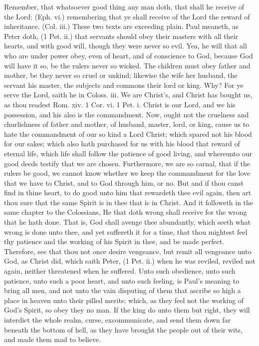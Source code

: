 Remember, that whatsoever good thing any man doth, 
that shall he receive of the Lord: (Eph. vi.) remembering 
that ye shall receive of the Lord the reward of inheritance. 
(Col. iii.) These two texts are exceeding plain. Paul 
meaneth, as Peter doth, (1 Pet. ii.) that servants should 
obey their masters with all their hearts, and with good 
will, though they were never so evil. Yea, he will 
that all who are under power obey, even of heart, and of 
conscience to God, because God will have it so, be the 
rulers never so wicked. The children must obey father 
and mother, be they never so cruel or unkind; likewise 
the wife her husband, the servant his master, the subjects 
and commons their lord or king. Why? For ye serve the 
Lord, saith he in Coloss. iii. We are Christ's, and Christ 
has bought us, as thou readest Rom. xiv. 1 Cor. vi. 
1 Pet. i. Christ is our Lord, and we his possession, and 
his also is the commandment. Now, ought not the cruelness
and churlishness of father and mother, of husband, 
master, lord, or king, cause us to hate the commandment 
of our so kind a Lord Christ; which spared not his blood 
for our sakes; which also hath purchased for us with his 
blood that reward of eternal life, which life shall follow 
the patience of good living, and whereunto our good deeds 
testify that we are chosen. Furthermore, we are so carnal,
that if the rulers be good, we cannot know whether 
we keep the commandment for the love that we have to 
Christ, and to God through him, or no. But and if thou 
canst find in thine heart, to do good unto him that rewardeth 
thee evil again, then art thou sure that the same Spirit is 
in thee that is in Christ. And it followeth in the same 
chapter to the Colossians, He that doth wrong shall receive
for the wrong that he hath done. That is, God 
shall avenge thee abundantly, which seeth what wrong is 
done unto thee, and yet suffereth it for a time, that thou 
mightest feel thy patience and the working of his Spirit in 
thee, and be made perfect. Therefore, see that thou 
not once desire vengeance, but remit all vengeance unto 
God, as Christ did, which saith Peter, (1 Pet. ii.) when 
he was reviled, reviled not again, neither threatened when 
he suffered. Unto such obedience, unto such patience, 
unto such a poor heart, and unto such feeling, is Paul's 
meaning to bring all men, and not unto the vain disputing 
of them that ascribe so high a place in heaven unto their 
pilled merits; which, as they feel not the working of 
God's Spirit, so obey they no man. If the king do unto 
them but right, they will interdict the whole realm, curse, 
excommunicate, and send them down far beneath the 
bottom of hell, as they have brought the people out of 
their wits, and made them mad to believe. 


